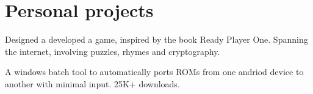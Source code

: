 \documentclass[]{font}
\begin{document}
\begin{minipage}[t]{0.66\textwidth}


\sectionsep



\section{Personal projects}

Designed a developed a game, inspired by the book Ready Player One. Spanning the internet, involving puzzles, rhymes and cryptography.
\sectionsep


A windows batch tool to automatically ports ROMs from one andriod device to another with minimal input. 25K+ downloads.
\sectionsep

\end{minipage} 
\end{document}
